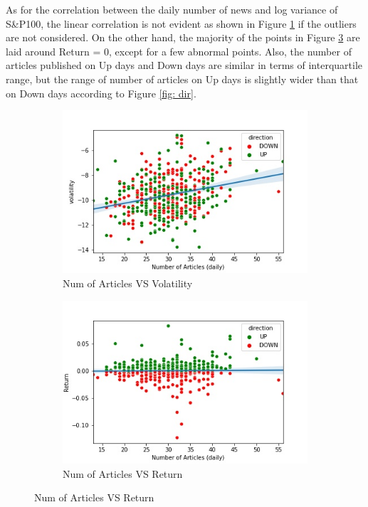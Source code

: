 \documentclass[a4paper, 12pt]{report}
\begin{document}
    As for the correlation between the daily number of news and log variance of S{\&}P100, the linear correlation is not evident as shown in Figure \ref{fig: vol_num} if the outliers are not considered. On the other hand, the majority of the points in Figure \ref{fig: return_num} are laid around Return = 0, except for a few abnormal points. Also, the number of articles published on Up days and Down days are similar in terms of interquartile range, but the range of number of articles on Up days is slightly wider than that on Down days according to Figure \ref{fig: dir}.
    

    \begin{figure}[H]
    \begin{subfigure}{.5\textwidth}
        \centering
        \includegraphics[width=1.0\linewidth]{graphs/vol_num1.jpg}
        \caption{Num of Articles VS Volatility}
        \label{fig: vol_num}
    \end{subfigure}
    \begin{subfigure}{.5\textwidth}
        \centering
        \includegraphics[width=1.0\linewidth]{graphs/return_num1.jpg}
        \caption{Num of Articles VS Return}
        \label{fig: return_num}
    \end{subfigure}
    \end{figure}
    
\end{document}
